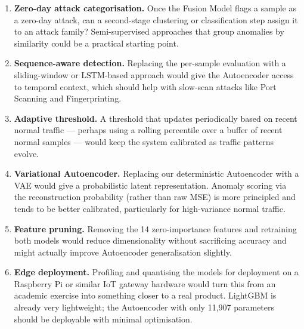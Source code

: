 \documentclass[12pt,a4paper]{report}
\begin{document}
\begin{enumerate}
  \item \textbf{Zero-day attack categorisation.} Once the Fusion Model flags a
        sample as a zero-day attack, can a second-stage clustering or classification
        step assign it to an attack family? Semi-supervised approaches that group
        anomalies by similarity could be a practical starting point.

  \item \textbf{Sequence-aware detection.} Replacing the per-sample evaluation
        with a sliding-window or LSTM-based approach would give the Autoencoder
        access to temporal context, which should help with slow-scan attacks like
        Port Scanning and Fingerprinting.

  \item \textbf{Adaptive threshold.} A threshold that updates periodically based
        on recent normal traffic — perhaps using a rolling percentile over a
        buffer of recent normal samples — would keep the system calibrated as
        traffic patterns evolve.

  \item \textbf{Variational Autoencoder.} Replacing our deterministic Autoencoder
        with a VAE would give a probabilistic latent representation. Anomaly
        scoring via the reconstruction probability (rather than raw MSE) is more
        principled and tends to be better calibrated, particularly for
        high-variance normal traffic.

  \item \textbf{Feature pruning.} Removing the 14 zero-importance features and
        retraining both models would reduce dimensionality without sacrificing
        accuracy and might actually improve Autoencoder generalisation slightly.

  \item \textbf{Edge deployment.} Profiling and quantising the models for
        deployment on a Raspberry Pi or similar IoT gateway hardware would
        turn this from an academic exercise into something closer to a real
        product. LightGBM is already very lightweight; the Autoencoder with
        only 11,907 parameters should be deployable with minimal optimisation.
\end{enumerate}



\end{document}
